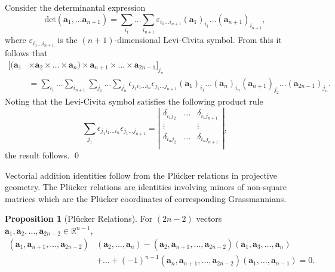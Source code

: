 \documentclass[fleqn,11pt,twoside]{article}
\makeatletter
\renewenvironment{proof}[1][\proofname]{\par
  \normalfont
  \topsep6\p@\@plus6\p@ \trivlist
  \item[\hskip\labelsep\textbf{%
    #1\@addpunct{.}}]\ignorespaces
}{%
  \qed\endtrivlist
}
\theoremstyle{definition}
\newtheorem{prop}{Proposition}
\makeatother
\begin{document}
\begin{proof}
Consider the determinantal expression
\begin{equation}
\mbox{det}(\mathbf{a}_1,\dots\mathbf{a}_{n+1})=\sum_{i_1}\dots\sum_{i_{n+1}}\varepsilon_{i_1\dots i_{n+1}}(\mathbf{a}_1)_{i_1}\dots(\mathbf{a}_{n+1})_{i_{n+1}},
\end{equation}
where $\varepsilon_{i_1\dots i_{n+1}}$ is the $(n+1)$-dimensional Levi-Civita symbol. From this it follows that
\begin{equation}
\begin{split}
[(\mathbf{a}_1&\times\mathbf{a}_2\times\dots\times\mathbf{a}_n)\times\mathbf{a}_{n+1}\times\dots\times\mathbf{a}_{2n-1}]_{j_n}\\
&=\sum_{i_1}\dots\sum_{i_{n+1}}\sum_{j_1}\dots\sum_{j_{n}}\epsilon_{j_1i_1\dots i_n}\epsilon_{j_1\dots j_{n+1}}(\mathbf{a}_1)_{i_1}\dots(\mathbf{a}_{n})_{i_{n}}(\mathbf{a}_{n+1})_{j_2}\dots(\mathbf{a}_{2n-1})_{j_{n}}.
\end{split}
\end{equation}
Noting that the Levi-Civita symbol satisfies the following product rule
\begin{equation}
\sum_{j_1}\epsilon_{j_1i_1\dots i_n}\epsilon_{j_1\dots j_{n+1}}=\left|
\begin{array}{ccc}
\delta_{i_1j_2}&\dots & \delta_{i_1j_{n+1}}\\
\vdots & &\vdots\\
\delta_{i_nj_2}&\dots & \delta_{i_{n}j_{n+1}}\\
\end{array}
\right|,
\end{equation}
the result follows.
\end{proof}

Vectorial addition identities follow from the Pl\"ucker relations in projective geometry. The Pl\"ucker relations are identities involving minors of non-square matrices which are the Pl\"ucker coordinates of corresponding Grassmannians.

\begin{prop}[Pl\"ucker Relations]
For $(2n-2)$ vectors $\mathbf{a}_1,\mathbf{a}_2,\dots,\mathbf{a}_{2n-2}\in\mathbb{R}^{n-1}$,
\begin{equation}
\label{eq:plucker}
\begin{split}
(\mathbf{a}_1,\mathbf{a}_{n+1},\dots,\mathbf{a}_{2n-2})&(\mathbf{a}_2,\dots,\mathbf{a}_n)-(\mathbf{a}_2,\mathbf{a}_{n+1},\dots,\mathbf{a}_{2n-2})(\mathbf{a}_1,\mathbf{a}_3,\dots,\mathbf{a}_n)\\
&+\dots+(-1)^{n-1}(\mathbf{a}_n,\mathbf{a}_{n+1},\dots,\mathbf{a}_{2n-2})(\mathbf{a}_1,\dots,\mathbf{a}_{n-1})=0.
\end{split}
\end{equation}
\end{prop}
\end{document}
